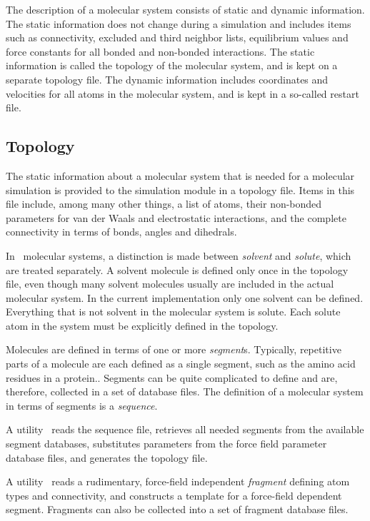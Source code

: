 The description of a molecular system consists of static and dynamic
information. The static information does not change during a
simulation and includes items such as connectivity, excluded and third
neighbor lists, equilibrium values and force constants for all
bonded and non-bonded interactions. The static information is called
the topology of the molecular system, and is kept on a separate
topology file. The dynamic information includes coordinates and
velocities for all atoms in the molecular system, and is kept in a
so-called restart file.

\subsection{Topology}
\label{sec:nwatopology}
The static information about a molecular system that is needed for
a molecular simulation is provided to the simulation module in a
topology file. 
Items in this file include, among many other things, 
a list of atoms, their non-bonded parameters for van der Waals and
electrostatic interactions, and the complete connectivity in terms
of bonds, angles and dihedrals.

In \nwargos\ molecular systems, a distinction is made between 
{\it solvent} and {\it solute}, which are treated separately.
A solvent molecule is defined only once in the topology file,
even though many solvent molecules usually are included in the
actual molecular system. In the current implementation only one 
solvent can be defined. Everything that is not solvent in the 
molecular system is solute. Each solute atom in the system must 
be explicitly defined in the topology. 

Molecules are defined in terms of one or more {\it segment}s. 
Typically, repetitive parts of a molecule are each defined as a single
segment, such as the amino acid residues in a protein.. 
Segments  can be quite complicated to define and are, therefore, 
collected in a set of database files. 
The definition of a molecular system in terms of segments is a
{\it sequence}.

A utility \nwtop\ reads the sequence file, retrieves all needed 
segments from the available segment databases, substitutes parameters
from the force field parameter database files, and generates the
topology file.

A utility \nwsgm\ reads a rudimentary, force-field independent
{\it fragment} defining atom types and connectivity, and 
constructs a template for a force-field dependent segment.
Fragments can also be collected into a set of fragment database
files.

